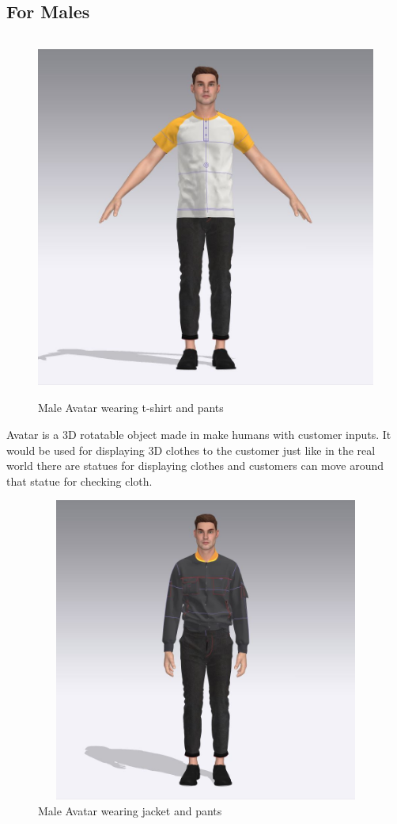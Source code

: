 \subsection{For Males}
\begin{figure}[H]
    \centering
    \includegraphics[width=13cm,height=12cm]{Figures/3DAvatars/male1.jpeg}
    \caption{Male Avatar wearing t-shirt and pants}
    \label{Male Avatar wearing t-shirt and pants}
   
\end{figure}
	Avatar is a 3D rotatable object made in make humans with customer inputs. It would be used for displaying 3D clothes to the customer just like in the real world there are statues for displaying clothes and customers can move around that statue for checking cloth.  
\begin{figure}[H]
    \centering
    \includegraphics[width=12cm,height=10cm]{Figures/3DAvatars/male2.jpeg}
    \caption{Male Avatar wearing jacket and pants}
    \label{Male Avatar wearing jacket and pants}
 
\end{figure}
